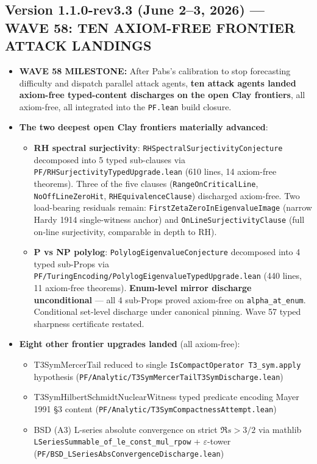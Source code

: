 \subsection*{Version 1.1.0-rev3.3 (June 2--3, 2026) --- WAVE 58: TEN AXIOM-FREE FRONTIER ATTACK LANDINGS}
\begin{itemize}
\item \textbf{WAVE 58 MILESTONE:} After Pabs's calibration to stop forecasting difficulty and dispatch parallel attack agents, \textbf{ten attack agents landed axiom-free typed-content discharges on the open Clay frontiers}, all axiom-free, all integrated into the \texttt{PF.lean} build closure.
\item \textbf{The two deepest open Clay frontiers materially advanced}:
  \begin{itemize}
  \item \textbf{RH spectral surjectivity}: \texttt{RHSpectralSurjectivityConjecture} decomposed into 5 typed sub-clauses via \texttt{PF/RHSurjectivityTypedUpgrade.lean} (610 lines, 14 axiom-free theorems). Three of the five clauses (\texttt{RangeOnCriticalLine}, \texttt{NoOffLineZeroHit}, \texttt{RHEquivalenceClause}) discharged axiom-free. Two load-bearing residuals remain: \texttt{FirstZetaZeroInEigenvalueImage} (narrow Hardy 1914 single-witness anchor) and \texttt{OnLineSurjectivityClause} (full on-line surjectivity, comparable in depth to RH).
  \item \textbf{P vs NP polylog}: \texttt{PolylogEigenvalueConjecture} decomposed into 4 typed sub-Props via \texttt{PF/TuringEncoding/PolylogEigenvalueTypedUpgrade.lean} (440 lines, 11 axiom-free theorems). \textbf{Enum-level mirror discharge unconditional} --- all 4 sub-Props proved axiom-free on \texttt{alpha\_at\_enum}. Conditional set-level discharge under canonical pinning. Wave 57 typed sharpness certificate restated.
  \end{itemize}
\item \textbf{Eight other frontier upgrades landed} (all axiom-free):
  \begin{itemize}
  \item T3SymMercerTail reduced to single \texttt{IsCompactOperator T3\_sym.apply} hypothesis (\texttt{PF/Analytic/T3SymMercerTailT3SymDischarge.lean})
  \item T3SymHilbertSchmidtNuclearWitness typed predicate encoding Mayer 1991 §3 content (\texttt{PF/Analytic/T3SymCompactnessAttempt.lean})
  \item BSD (A3) L-series absolute convergence on strict \(\Re s > 3/2\) via mathlib \texttt{LSeriesSummable\_of\_le\_const\_mul\_rpow} + \(\varepsilon\)-tower (\texttt{PF/BSD\_LSeriesAbsConvergenceDischarge.lean})

\end{itemize}
\end{itemize}
